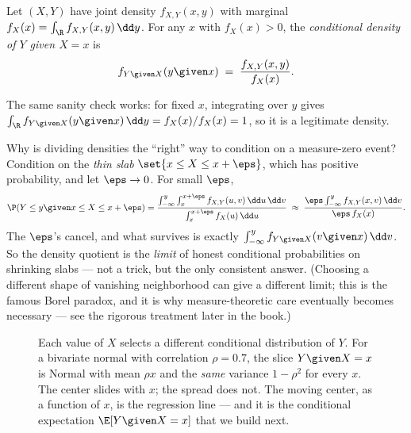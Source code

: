 \begin{definition}
\label{ch15:def-cond-density}
Let $(X,Y)$ have joint density $f_{X,Y}(x,y)$ with marginal $f_X(x) = \int_{\R} f_{X,Y}(x,y)\,\dd y$.
For any $x$ with $f_X(x) > 0$, the \emph{conditional density of $Y$ given $X=x$} is
\[
  f_{Y \given X}(y \given x) \;=\; \frac{f_{X,Y}(x,y)}{f_X(x)}.
\]
\end{definition}

The same sanity check works: for fixed $x$, integrating over $y$ gives
$\int_\R f_{Y\given X}(y\given x)\,\dd y = f_X(x)/f_X(x) = 1$, so it is a legitimate density.

\begin{whybox}
Why is dividing densities the ``right'' way to condition on a measure-zero event? Condition on the
\emph{thin slab} $\set{x \le X \le x + \eps}$, which has positive probability, and let $\eps \to 0$.
For small $\eps$,
\[
  \P(Y \le y \given x \le X \le x+\eps)
  = \frac{\int_{-\infty}^{y}\int_x^{x+\eps} f_{X,Y}(u,v)\,\dd u\,\dd v}
         {\int_x^{x+\eps} f_X(u)\,\dd u}
  \;\approx\; \frac{\eps \int_{-\infty}^{y} f_{X,Y}(x,v)\,\dd v}{\eps\, f_X(x)}.
\]
The $\eps$'s cancel, and what survives is exactly $\int_{-\infty}^{y} f_{Y\given X}(v \given x)\,\dd v$.
So the density quotient is the \emph{limit} of honest conditional probabilities on shrinking slabs ---
not a trick, but the only consistent answer. (Choosing a different shape of vanishing neighborhood can
give a different limit; this is the famous Borel paradox, and it is why measure-theoretic care
eventually becomes necessary --- see the rigorous treatment later in the book.)
\end{whybox}

\begin{figure}[H]
\centering
{}
\caption{Each value of $X$ selects a different conditional distribution of $Y$. For a bivariate normal
with correlation $\rho = 0.7$, the slice $Y \given X = x$ is Normal with mean $\rho x$ and the
\emph{same} variance $1-\rho^2$ for every $x$. The center slides with $x$; the spread does not. The
moving center, as a function of $x$, is the regression line --- and it is the conditional expectation
$\E[Y \given X = x]$ that we build next.}
\label{ch15:fig-slices}
\end{figure}

